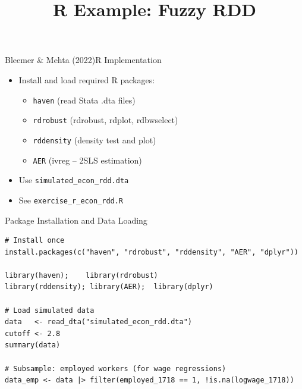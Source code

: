 \documentclass[hyperref={pdfpagelabels=false}]{beamer}
\begin{document}

\title[]
{R Example: Fuzzy RDD}

\author
{}

\institute{}

\date
{}

\begin{frame}{}
	\titlepage
\end{frame}


\begin{frame}{Bleemer \& Mehta (2022)}{R Implementation}
	\begin{itemize}
		\item Install and load required R packages:
		\begin{itemize}
			\vspace{0.2cm}
			\item \texttt{haven} (read Stata .dta files)
			\vspace{0.2cm}
			\item \texttt{rdrobust} (rdrobust, rdplot, rdbwselect)
			\vspace{0.2cm}
			\item \texttt{rddensity} (density test and plot)
			\vspace{0.2cm}
			\item \texttt{AER} (ivreg -- 2SLS estimation)
		\end{itemize}
		\vspace{0.2cm}
		\item Use \texttt{simulated\_econ\_rdd.dta}
		\vspace{0.2cm}
		\item See \texttt{exercise\_r\_econ\_rdd.R}
	\end{itemize}
\end{frame}


\begin{frame}[fragile]{Package Installation and Data Loading}
\begin{lstlisting}[style=r-style]
# Install once
install.packages(c("haven", "rdrobust", "rddensity", "AER", "dplyr"))

library(haven);    library(rdrobust)
library(rddensity); library(AER);  library(dplyr)

# Load simulated data
data   <- read_dta("simulated_econ_rdd.dta")
cutoff <- 2.8
summary(data)

# Subsample: employed workers (for wage regressions)
data_emp <- data |> filter(employed_1718 == 1, !is.na(logwage_1718))
\end{lstlisting}
\end{frame}
\end{document}
